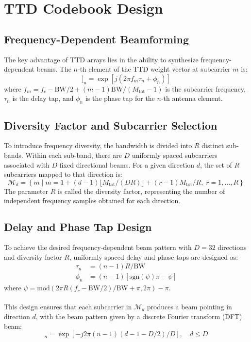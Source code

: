 \documentclass[12pt,letterpaper]{article}
\begin{document}
\section{TTD Codebook Design}

\subsection{Frequency-Dependent Beamforming}

The key advantage of TTD arrays lies in the ability to synthesize frequency-dependent beams. The $n$-th element of the TTD weight vector at subcarrier $m$ is:
\begin{equation}
[\mathbf{w}[m]]_n = \exp[j(2\pi f_m \tau_n + \phi_n)]
\end{equation}
where $f_m = f_c - \text{BW}/2 + (m-1)\text{BW}/(M_{\text{tot}}-1)$ is the subcarrier frequency, $\tau_n$ is the delay tap, and $\phi_n$ is the phase tap for the $n$-th antenna element.

\subsection{Diversity Factor and Subcarrier Selection}

To introduce frequency diversity, the bandwidth is divided into $R$ distinct sub-bands. Within each sub-band, there are $D$ uniformly spaced subcarriers associated with $D$ fixed directional beams. For a given direction $d$, the set of $R$ subcarriers mapped to that direction is:
\begin{equation}
\mathcal{M}_d = \left\{ m \mid m = 1 + (d-1)\lfloor M_{\text{tot}}/(DR)\rfloor + (r-1)M_{\text{tot}}/R, \; r = 1, \ldots, R \right\}
\end{equation}
The parameter $R$ is called the diversity factor, representing the number of independent frequency samples obtained for each direction.

\subsection{Delay and Phase Tap Design}

To achieve the desired frequency-dependent beam pattern with $D = 32$ directions and diversity factor $R$, uniformly spaced delay and phase taps are designed as:
\begin{align}
\tau_n &= (n-1)R/\text{BW} \\
\phi_n &= (n-1)[\text{sgn}(\psi)\pi - \psi]
\end{align}
where $\psi = \text{mod}(2\pi R(f_c - \text{BW}/2)/\text{BW} + \pi, 2\pi) - \pi$.
\\ \\
This design ensures that each subcarrier in $\mathcal{M}_d$ produces a beam pointing in direction $d$, with the beam pattern given by a discrete Fourier transform (DFT) beam:
\begin{equation}
[\mathbf{f}_d]_n = \exp[-j2\pi(n-1)(d-1-D/2)/D], \quad d \leq D
\end{equation}
\end{document}
